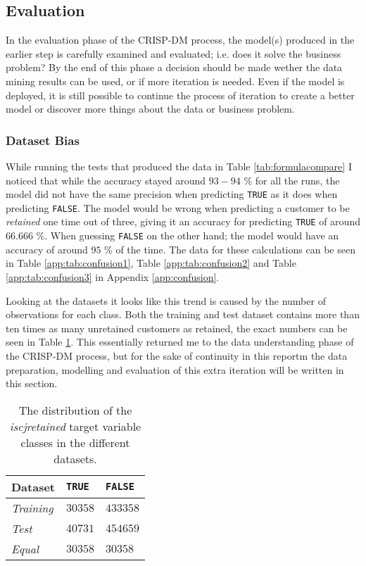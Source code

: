 \subsection{Evaluation}
\label{sec:eval}

In the evaluation phase of the CRISP-DM process, the model(s) produced in the
earlier step is carefully examined and evaluated; i.e. does it solve the
business problem? By the end of this phase a decision should be made wether the
data mining results can be used, or if more iteration is needed. Even if the
model is deployed, it is still possible to continue the process of iteration to
create a better model or discover more things about the data or business
problem.

\subsubsection{Dataset Bias}

While running the tests that produced the data in Table \ref{tab:formulacompare}
I noticed that while the accuracy stayed around $93 - 94$ \% for all the runs,
the model did not have the same precision when predicting \texttt{TRUE} as it
does when predicting \texttt{FALSE}. The model would be wrong when predicting a
customer to be \textit{retained} one time out of three, giving it an accuracy
for predicting \texttt{TRUE} of around $66.666$ \%. When guessing \texttt{FALSE}
on the other hand; the model would have an accuracy of around $95$ \% of the
time. The data for these calculations can be seen in Table
\ref{app:tab:confusion1}, Table \ref{app:tab:confusion2} and Table
\ref{app:tab:confusion3} in Appendix \ref{app:confusion}.

Looking at the datasets it looks like this trend is caused by the number of
observations for each class. Both the training and test dataset contains more
than ten times as many unretained customers as retained, the exact numbers can
be seen in Table \ref{tab:datasetretention}. This essentially returned me to the
data understanding phase of the CRISP-DM process, but for the sake of continuity
in this reportm the data preparation, modelling and evaluation of this extra
iteration will be written in this section.

\begin{table}[H]
  \centering
  \begin{tabular}{lll}
    \textbf{Dataset}  & \texttt{TRUE} & \texttt{FALSE} \\ \hline
    \textit{Training} & $30358$       & $433358$       \\
    \textit{Test}     & $40731$       & $454659$       \\
    \textit{Equal}    & $30358$       &  $30358$
  \end{tabular}
  \caption{The distribution of the \textit{iscjretained} target variable classes
    in the different datasets.}
  \label{tab:datasetretention}
\end{table}

